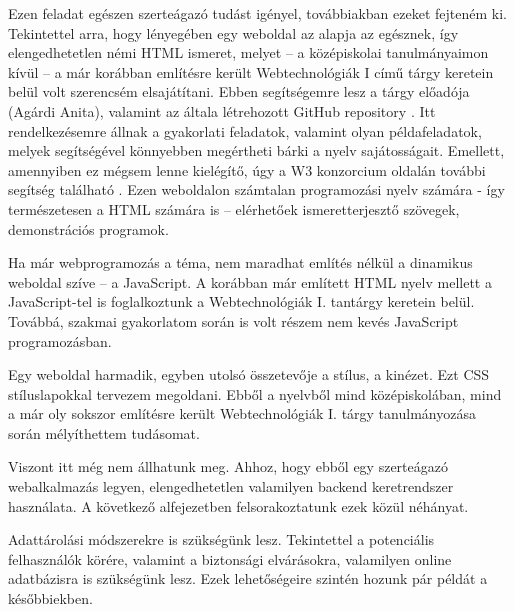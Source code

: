 


Ezen feladat egészen szerteágazó tudást igényel, továbbiakban ezeket fejteném ki. Tekintettel arra, hogy lényegében egy weboldal az alapja az egésznek, így elengedhetetlen némi HTML ismeret, melyet – a középiskolai tanulmányaimon kívül – a már korábban említésre került Webtechnológiák I című tárgy keretein belül volt szerencsém elsajátítani. Ebben segítségemre lesz a tárgy előadója (Agárdi Anita), valamint az általa létrehozott GitHub repository \cite{webtechgithub}. Itt rendelkezésemre állnak a gyakorlati feladatok, valamint olyan példafeladatok, melyek segítségével könnyebben megértheti bárki a nyelv sajátosságait. Emellett, amennyiben ez mégsem lenne kielégítő, úgy a W3 konzorcium oldalán további segítség található \cite{w3schools}. Ezen weboldalon számtalan programozási nyelv számára - így természetesen a HTML számára is – elérhetőek ismeretterjesztő szövegek, demonstrációs programok.

Ha már webprogramozás a téma, nem maradhat említés nélkül a dinamikus weboldal szíve – a JavaScript. A korábban már említett HTML nyelv mellett a JavaScript-tel is foglalkoztunk a Webtechnológiák I. tantárgy keretein belül. Továbbá, szakmai gyakorlatom során is volt részem nem kevés JavaScript programozásban.

Egy weboldal harmadik, egyben utolsó összetevője a stílus, a kinézet. Ezt CSS stíluslapokkal tervezem megoldani. Ebből a nyelvből mind középiskolában, mind a már oly sokszor említésre került Webtechnológiák I. tárgy tanulmányozása során mélyíthettem tudásomat.

Viszont itt még nem állhatunk meg. Ahhoz, hogy ebből egy szerteágazó webalkalmazás legyen, elengedhetetlen valamilyen backend keretrendszer használata. A következő alfejezetben felsorakoztatunk ezek közül néhányat.

Adattárolási módszerekre is szükségünk lesz. Tekintettel a potenciális felhasználók körére, valamint a biztonsági elvárásokra, valamilyen online adatbázisra is szükségünk lesz. Ezek lehetőségeire szintén hozunk pár példát a későbbiekben.

